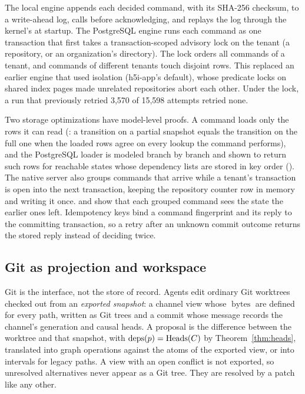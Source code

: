 The local engine appends each decided command, with its SHA-256 checksum, to a write-ahead log, calls  before acknowledging, and replays the log through the kernel's  at startup. The PostgreSQL engine runs each command as one  transaction that first takes a transaction-scoped advisory lock on the tenant (a repository, or an organization's directory). The lock orders all commands of a tenant, and commands of different tenants touch disjoint rows. This replaced an earlier engine that used  isolation (h5i-app's default), whose predicate locks on shared index pages made unrelated repositories abort each other. Under the lock, a run that previously retried 3,570 of 15,598 attempts retried none.

Two storage optimizations have model-level proofs. A command loads only the rows it can read (: a transition on a partial snapshot equals the transition on the full one when the loaded rows agree on every lookup the command performs), and the PostgreSQL loader is modeled branch by branch and shown to return such rows for reachable states whose dependency lists are stored in key order (). The native server also groups commands that arrive while a tenant's transaction is open into the next transaction, keeping the repository counter row in memory and writing it once.  and  show that each grouped command sees the state the earlier ones left. Idempotency keys bind a command fingerprint and its reply to the committing transaction, so a retry after an unknown commit outcome returns the stored reply instead of deciding twice.

\subsection{Git as projection and workspace}\label{sec:gitinterface}
Git is the interface, not the store of record. Agents edit ordinary Git worktrees checked out from an \emph{exported snapshot}: a channel view whose $\operatorname{bytes}$ are defined for every path, written as Git trees and a commit whose message records the channel's generation and causal heads. A proposal is the difference between the worktree and that snapshot, with $\operatorname{deps}(p)=\operatorname{Heads}(C)$ by Theorem~\ref{thm:heads}, translated into graph operations against the atoms of the exported view, or into intervals for legacy paths. A view with an open conflict is not exported, so unresolved alternatives never appear as a Git tree. They are resolved by a patch like any other.

